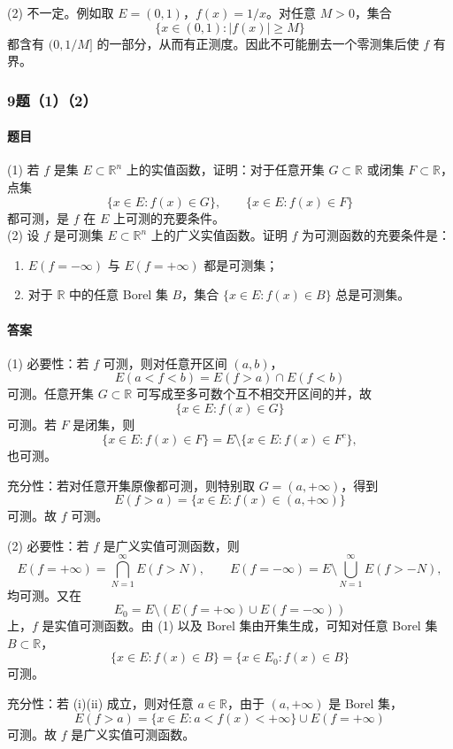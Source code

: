 \documentclass{article}
\begin{document}
	(2) 不一定。例如取 $E=(0,1)$，$f(x)=1/x$。对任意 $M>0$，集合
	\[
	\{x\in(0,1):|f(x)|\ge M\}
	\]
	都含有 $(0,1/M]$ 的一部分，从而有正测度。因此不可能删去一个零测集后使 $f$ 有界。
	
	\subsubsection*{9题（1）（2）}
	\paragraph{题目} (1) 若 $f$ 是集 $E\subset\mathbb{R}^n$ 上的实值函数，证明：对于任意开集 $G\subset\mathbb{R}$ 或闭集 $F\subset\mathbb{R}$，点集
	\[
	\{x\in E:f(x)\in G\},\qquad \{x\in E:f(x)\in F\}
	\]
	都可测，是 $f$ 在 $E$ 上可测的充要条件。\\
	(2) 设 $f$ 是可测集 $E\subset\mathbb{R}^n$ 上的广义实值函数。证明 $f$ 为可测函数的充要条件是：
	\begin{enumerate}[label=(\roman*)]
		\item $E(f=-\infty)$ 与 $E(f=+\infty)$ 都是可测集；
		\item 对于 $\mathbb{R}$ 中的任意 Borel 集 $B$，集合 $\{x\in E:f(x)\in B\}$ 总是可测集。
	\end{enumerate}
	
	\paragraph{答案} (1) 必要性：若 $f$ 可测，则对任意开区间 $(a,b)$，
	\[
	E(a<f<b)=E(f>a)\cap E(f<b)
	\]
	可测。任意开集 $G\subset\mathbb{R}$ 可写成至多可数个互不相交开区间的并，故
	\[
	\{x\in E:f(x)\in G\}
	\]
	可测。若 $F$ 是闭集，则
	\[
	\{x\in E:f(x)\in F\}=E\setminus\{x\in E:f(x)\in F^c\},
	\]
	也可测。
	
	充分性：若对任意开集原像都可测，则特别取 $G=(a,+\infty)$，得到
	\[
	E(f>a)=\{x\in E:f(x)\in(a,+\infty)
	\}
	\]
	可测。故 $f$ 可测。
	
	(2) 必要性：若 $f$ 是广义实值可测函数，则
	\[
	E(f=+\infty)=\bigcap_{N=1}^{\infty}E(f>N),
	\qquad
	E(f=-\infty)=E\setminus\bigcup_{N=1}^{\infty}E(f>-N),
	\]
	均可测。又在
	\[
	E_0=E\setminus(E(f=+\infty)\cup E(f=-\infty))
	\]
	上，$f$ 是实值可测函数。由 (1) 以及 Borel 集由开集生成，可知对任意 Borel 集 $B\subset\mathbb{R}$，
	\[
	\{x\in E:f(x)\in B\}=\{x\in E_0:f(x)\in B\}
	\]
	可测。
	
	充分性：若 (i)(ii) 成立，则对任意 $a\in\mathbb{R}$，由于 $(a,+\infty)$ 是 Borel 集，
	\[
	E(f>a)=\{x\in E:a<f(x)<+\infty\}\cup E(f=+\infty)
	\]
	可测。故 $f$ 是广义实值可测函数。
	
\end{document}
